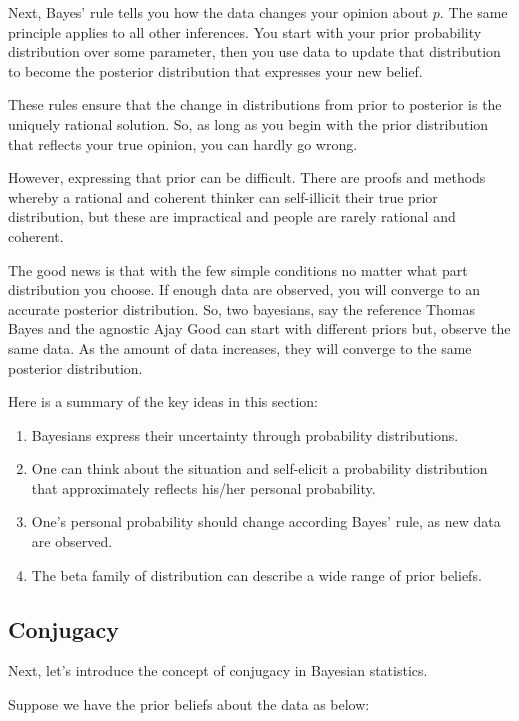\documentclass[]{book}
\theoremstyle{definition}
\theoremstyle{definition}
\theoremstyle{definition}
\theoremstyle{remark}
\begin{document}
Next, Bayes' rule tells you how the data changes your opinion about
\(p\). The same principle applies to all other inferences. You start
with your prior probability distribution over some parameter, then you
use data to update that distribution to become the posterior
distribution that expresses your new belief.

These rules ensure that the change in distributions from prior to
posterior is the uniquely rational solution. So, as long as you begin
with the prior distribution that reflects your true opinion, you can
hardly go wrong.

However, expressing that prior can be difficult. There are proofs and
methods whereby a rational and coherent thinker can self-illicit their
true prior distribution, but these are impractical and people are rarely
rational and coherent.

The good news is that with the few simple conditions no matter what part
distribution you choose. If enough data are observed, you will converge
to an accurate posterior distribution. So, two bayesians, say the
reference Thomas Bayes and the agnostic Ajay Good can start with
different priors but, observe the same data. As the amount of data
increases, they will converge to the same posterior distribution.

Here is a summary of the key ideas in this section:

\begin{enumerate}
\def\labelenumi{\arabic{enumi}.}
\item
  Bayesians express their uncertainty through probability distributions.
\item
  One can think about the situation and self-elicit a probability
  distribution that approximately reflects his/her personal probability.
\item
  One's personal probability should change according Bayes' rule, as new
  data are observed.
\item
  The beta family of distribution can describe a wide range of prior
  beliefs.
\end{enumerate}

\subsection{Conjugacy}\label{conjugacy}

Next, let's introduce the concept of conjugacy in Bayesian statistics.

Suppose we have the prior beliefs about the data as below:
\end{document}
